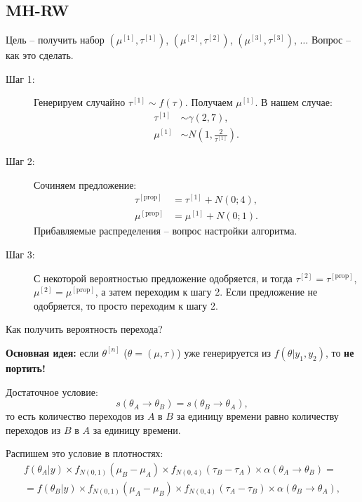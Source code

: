 \documentclass[10pt, a4paper]{extarticle}
\begin{document}
\subsection{MH-RW}

Цель -- получить набор $\left( \mu^{[1]},\tau^{[1]}  \right)$, $\left( \mu^{[2]},\tau^{[2]}  \right)$, $\left( \mu^{[3]},\tau^{[3]}  \right)$, $\ldots$ Вопрос -- как это сделать.

\begin{description}
	\item[Шаг 1:] Генерируем случайно $\tau^{[1]} \sim f(\tau)$. Получаем $\mu^{[1]}$. В нашем случае: 
	\begin{align*}
	\tau^{[1]} &\sim \gamma(2, 7), \\
	\mu^{[1]} &\sim N(1, \frac{2}{\tau^{[1]}}).
	\end{align*}
	
	\item[Шаг 2:] Сочиняем предложение:
	\begin{align*}
		\tau^{[\text{prop}]} &= \tau^{[1]} + N(0; 4), \\
		\mu^{[\text{prop}]} &= \mu^{[1]} + N(0; 1).
	\end{align*}
	Прибавляемые распределения -- вопрос настройки алгоритма.
	
	\item[Шаг 3:] С некоторой вероятностью предложение одобряется, и тогда $\tau^{[2]} = \tau^{[\text{prop}]}$, $\mu^{[2]} = \mu^{[\text{prop}]}$, а затем переходим к шагу 2. Если предложение не одобряется, то просто переходим к шагу 2.
	
\end{description}
Как получить вероятность перехода?

\textbf{Основная идея:} если $\theta^{[n]}$ ($\theta = (\mu, \tau)$) уже генерируется из $f(\theta | y_1, y_2)$, то \textbf{не портить!}

Достаточное условие:
\[
s(\theta_A \rightarrow \theta_B) = s(\theta_B \rightarrow \theta_A),
\]
то есть количество переходов из $A$ в $B$ за единицу времени равно количеству переходов из $B$ в $A$ за единицу времени.

Распишем это условие в плотностях:
\begin{align*}
	f(\theta_A|y) \times f_{N(0,1)}(\mu_B - \mu_A)\times f_{N(0,4)}(\tau_B - \tau_A)\times\alpha(\theta_A \rightarrow \theta_B) =\\= f(\theta_B|y) \times f_{N(0,1)}(\mu_A - \mu_B)\times f_{N(0,4)}(\tau_A - \tau_B)\times\alpha(\theta_B \rightarrow \theta_A),
\end{align*}
\end{document}
